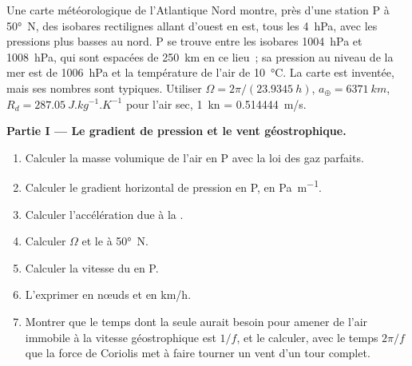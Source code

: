 \begin{problem}
\label{pb:b1:atmospheric-circulation:1}
Une carte météorologique de l'Atlantique Nord montre, près d'une station P à \ang{50}~N, des
isobares rectilignes allant d'ouest en est, tous les \qty{4}{hPa}, avec les pressions plus basses
au nord. P se trouve entre les isobares \qty{1004}{hPa} et \qty{1008}{hPa}, qui sont
espacées de \qty{250}{km} en ce lieu~; sa pression au niveau de la mer est de \qty{1006}{hPa} et la
température de l'air de \qty{10}{\degreeCelsius}. La carte est inventée, mais ses nombres sont typiques.
Utiliser $\Omega = 2\pi/(\qty{23.9345}{h})$, $a_\oplus = \qty{6371}{km}$, $R_d =
\qty{287.05}{J.kg^{-1}.K^{-1}}$ pour l'air sec, \qty{1}{kn} = \qty{0.514444}{m/s}.

\medskip
\noindent\textbf{Partie I --- Le gradient de pression et le vent géostrophique.}
\begin{enumerate}
  \item Calculer la masse volumique de l'air en P avec la loi des gaz parfaits.
  \item Calculer le gradient horizontal de pression en P, en \unit{Pa.m^{-1}}.
  \item Calculer l'accélération due à la .
  \item Calculer $\Omega$ et le  à \ang{50}~N.
  \item Calculer la vitesse du  en P.
  \item L'exprimer en nœuds et en \unit{km/h}.
  \item Montrer que le temps dont la seule  aurait besoin pour amener
        de l'air immobile à la vitesse géostrophique est $1/f$, et le calculer, avec
        le temps $2\pi/f$ que la force de Coriolis met à faire tourner un vent d'un tour complet.
\end{enumerate}


\end{problem}
